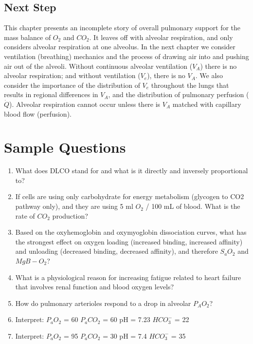 \subsection{Next Step}

This chapter presents an incomplete story of overall pulmonary support for the mass balance of $O_2$ and $CO_2$. It leaves off with alveolar respiration, and only considers alveolar respiration at one alveolus. In the next chapter we consider ventilation (breathing) mechanics and the process of drawing air into and pushing air out of the alveoli. Without continuous alveolar ventilation ($V_A$) there is no alveolar respiration; and without ventilation ($V_e$), there is no $V_A$. We also consider the importance of the distribution of $V_e$ throughout the lungs that results in regional differences in $V_A$, and the distribution of pulmonary perfusion ($\dot{Q}$). Alveolar respiration cannot occur unless there is $V_A$ matched with capillary blood flow (perfusion). 


\printbibliography[heading=subbibintoc]

\section*{Sample Questions}

\begin{enumerate}
    \item What does DLCO stand for and what is it directly and inversely proportional to?
    \item If cells are using only carbohydrate for energy metabolism (glycogen to CO2 pathway only), and they are using 5 ml $O_2$ / 100 mL of blood. What is the rate of $CO_2$ production?
    \item Based on the oxyhemoglobin and oxymyoglobin dissociation curves, what has the strongest effect on oxygen loading (increased binding, increased affinity) and unloading (decreased binding, decreased affinity), and therefore $S_a O_2$ and $MgB-O_2$?
    \item What is a physiological reason for increasing fatigue related to heart failure that involves renal function and blood oxygen levels?
    \item How do pulmonary arterioles respond to a drop in alveolar $P_A O_2$?
    \item Interpret: $P_aO_2$ = 60 $P_aCO_2$ = 60 pH = 7.23 $HCO_3^-$ = 22
    \item Interpret: $P_aO_2$ = 95 $P_aCO_2$ = 30 pH = 7.4 $HCO_3^-$ = 35
\end{enumerate} 